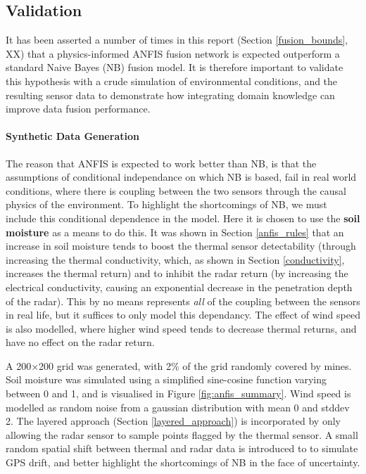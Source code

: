 \subsection{Validation} \label{compvis_anfisvalid}

It has been asserted a number of times in this report (Section \ref{fusion_bounds}, XX) that a physics-informed ANFIS fusion network is expected outperform a standard Naive Bayes (NB) fusion model. It is therefore important to validate this hypothesis with a crude simulation of environmental conditions, and the resulting sensor data to demonstrate how integrating domain knowledge can improve data fusion performance.

\paragraph{Synthetic Data Generation}  

    The reason that ANFIS is expected to work better than NB, is that the assumptions of conditional independance on which NB is based, fail in real world conditions, where there is coupling between the two sensors through the causal physics of the environment. To highlight the shortcomings of NB, we must include this conditional dependence in the model. Here it is chosen to use the \textbf{soil moisture} as a means to do this. It was shown in Section \ref{anfis_rules} that an increase in soil moisture tends to boost the thermal sensor detectability (through increasing the thermal conductivity, which, as shown in Section \ref{conductivity}, increases the thermal return) and to inhibit the radar return (by increasing the electrical conductivity, causing an exponential decrease in the penetration depth of the radar). This by no means represents \textit{all} of the coupling between the sensors in real life, but it suffices to only model this dependancy. The effect of wind speed is also modelled, where higher wind speed tends to decrease thermal returns, and have no effect on the radar return.
    
    A 200×200 grid was generated, with 2\% of the grid randomly covered by mines. Soil moisture was simulated using a simplified sine-cosine function varying between 0 and 1, and is visualised in Figure \ref{fig:anfis_summary}. Wind speed is modelled as random noise from a gaussian distribution with mean 0 and stddev 2. The layered approach (Section \ref{layered_approach}) is incorporated by only allowing the radar sensor to sample points flagged by the thermal sensor. A small random spatial shift between thermal and radar data is introduced to to simulate GPS drift, and better highlight the shortcomings of NB in the face of uncertainty.

